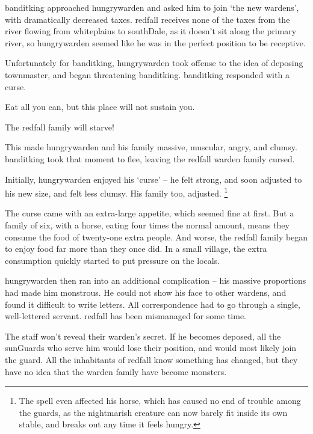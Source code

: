 \label{desperatemeasures}


\begin{exampletext}
  \noindent
  \Gls{banditking} approached \gls{hungrywarden} and asked him to join `the new \glspl{warden}', with dramatically decreased taxes.
  \Gls{redfall} receives none of the taxes from the river flowing from \gls{whiteplains} to \gls{southDale}, as it doesn't sit along the primary river, so \gls{hungrywarden} seemed like he was in the perfect position to be receptive.

  Unfortunately for \gls{banditking}, \gls{hungrywarden} took offense to the idea of deposing \gls{townmaster}, and began threatening \gls{banditking}.
  \Gls{banditking} responded with a curse.

  \begin{speechtext}
    Eat all you can, but this place will not sustain you.

    The \gls{redfall} family will starve!

  \end{speechtext}

  This  made \gls{hungrywarden} and his family massive, muscular, angry, and clumsy.
  \Gls{banditking} took that moment to flee, leaving the \gls{redfall} \gls{warden} family cursed.

  Initially, \gls{hungrywarden} enjoyed his `curse' -- he felt strong, and soon adjusted to his new size, and felt less clumsy.
  His family too, adjusted.%
  \footnote{The spell even affected his horse, which has caused no end of trouble among the guards, as the nightmarish creature can now barely fit inside its own stable, and breaks out any time it feels hungry.}

  \null
  The curse came with an extra-large appetite, which seemed fine at first.
  But a family of six, with a horse, eating four times the normal amount, means they consume the food of twenty-one extra people.
  And worse, the \gls{redfall} family began to enjoy food far more than they once did.
  In a small \gls{village}, the extra consumption quickly started to put pressure on the locals.

  \Gls{hungrywarden} then ran into an additional complication -- his massive proportions had made him monstrous.
  He could not show his face to other \glspl{warden}, and found it difficult to write letters.
  All correspondence had to go through a single, well-lettered servant.
  \Gls{redfall} has been mismanaged for some time.

  The staff won't reveal their \gls{warden}'s secret.
  If he becomes deposed, all the \glspl{sunGuard} who serve him would lose their position, and would most likely join the \gls{guard}.
  All the inhabitants of \gls{redfall} know something has changed, but they have no idea that the \gls{warden} family have become monsters.
\end{exampletext}

